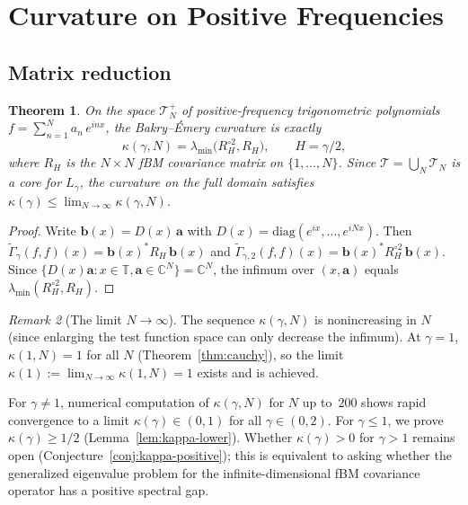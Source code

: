 \documentclass[11pt,a4paper]{article}
\theoremstyle{plain}
\newtheorem{theorem}{Theorem}[section]
\theoremstyle{definition}
\theoremstyle{remark}
\newtheorem{remark}[theorem]{Remark}
\newcommand{\C}{\mathbb{C}}
\newcommand{\T}{\mathbb{T}}
\begin{document}
\section{Curvature on Positive Frequencies}\label{sec:curvature}

\subsection{Matrix reduction}\label{sec:curv-pos}

\begin{theorem}\label{thm:curvature}
On the space $\mathcal{T}_N^+$ of positive-frequency trigonometric
polynomials $f = \sum_{n=1}^N a_n\,e^{inx}$, the Bakry--\'Emery
curvature is exactly
\begin{equation}\label{eq:kappa-def}
  \kappa(\gamma,N) = \lambda_{\min}\!\bigl(R_H^{\circ 2}, R_H\bigr),
  \qquad H = \gamma/2,
\end{equation}
where $R_H$ is the $N \times N$ fBM covariance matrix on $\{1,\ldots,N\}$.
Since $\mathcal{T} = \bigcup_N \mathcal{T}_N$ is a core for $L_\gamma$,
the curvature on the full domain satisfies
$\kappa(\gamma) \leq \lim_{N\to\infty} \kappa(\gamma,N)$.
\end{theorem}

\begin{proof}
Write $\mathbf{b}(x) = D(x)\,\mathbf{a}$ with
$D(x) = \mathrm{diag}(e^{ix},\ldots,e^{iNx})$. Then
$\widetilde{\Gamma}_\gamma(f,f)(x) = \mathbf{b}(x)^* R_H\,\mathbf{b}(x)$
and $\widetilde{\Gamma}_{\gamma,2}(f,f)(x) =
\mathbf{b}(x)^* R_H^{\circ 2}\,\mathbf{b}(x)$.
Since $\{D(x)\mathbf{a} : x \in \T, \mathbf{a} \in \C^N\} = \C^N$,
the infimum over $(x,\mathbf{a})$ equals
$\lambda_{\min}(R_H^{\circ 2}, R_H)$.
\end{proof}

\begin{remark}[The limit $N \to \infty$]
\label{rem:N-limit}
The sequence $\kappa(\gamma,N)$ is nonincreasing in $N$
(since enlarging the test function space can only decrease
the infimum).  At $\gamma = 1$, $\kappa(1,N) = 1$ for all
$N$ (Theorem~\ref{thm:cauchy}), so the limit
$\kappa(1) := \lim_{N\to\infty}\kappa(1,N) = 1$ exists
and is achieved.

For $\gamma \neq 1$, numerical computation of $\kappa(\gamma,N)$
for $N$ up to~$200$ shows rapid convergence to a limit
$\kappa(\gamma) \in (0,1)$ for all $\gamma \in (0,2)$.
For $\gamma \leq 1$, we prove $\kappa(\gamma) \geq 1/2$
(Lemma~\ref{lem:kappa-lower}). Whether $\kappa(\gamma) > 0$
for $\gamma > 1$ remains open
(Conjecture~\ref{conj:kappa-positive});
this is equivalent to asking
whether the generalized eigenvalue problem for the
infinite-dimensional fBM covariance operator has a positive
spectral gap.
\end{remark}
\end{document}

